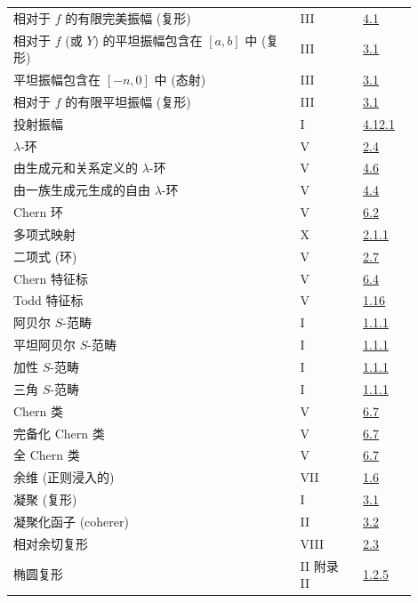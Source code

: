 \begin{longtable}{@{}>{\raggedright\arraybackslash}p{0.64\linewidth}>{\raggedright\arraybackslash}p{0.14\linewidth}>{\raggedright\arraybackslash}p{0.12\linewidth}@{}}
相对于 \(f\) 的有限完美振幅 (复形) & III & \hyperlink{sga6.e03.def.4-1}{4.1}\\
相对于 \(f\) (或 \(Y\)) 的平坦振幅包含在 \([a,b]\) 中 (复形) & III & \hyperlink{sga6.e03.def.3-1}{3.1}\\
平坦振幅包含在 \([-n,0]\) 中 (态射) & III & \hyperlink{sga6.e03.def.3-1}{3.1}\\
相对于 \(f\) 的有限平坦振幅 (复形) & III & \hyperlink{sga6.e03.def.3-1}{3.1}\\
投射振幅 & I & \hyperlink{sga6.e01.rem.4-12-1}{4.12.1}\\
\(\lambda\)-环 & V & \hyperlink{sga6.e05.def.2-4}{2.4}\\
由生成元和关系定义的 \(\lambda\)-环 & V & \hyperlink{sga6.e05.def.4-6}{4.6}\\
由一族生成元生成的自由 \(\lambda\)-环 & V & \hyperlink{sga6.e05.def.4-4}{4.4}\\
Chern 环 & V & \hyperlink{sga6.e05.def.6-2}{6.2}\\
多项式映射 & X & \hyperlink{sga6.e10.def.2-1-1}{2.1.1}\\
二项式 (环) & V & \hyperlink{sga6.e05.def.2-7}{2.7}\\
Chern 特征标 & V & \hyperlink{sga6.e05.def.6-4}{6.4}\\
Todd 特征标 & V & \hyperlink{sga6.e05.para.1-16}{1.16}\\
阿贝尔 \(S\)-范畴 & I & \hyperlink{sga6.e01.para.1-1-1}{1.1.1}\\
平坦阿贝尔 \(S\)-范畴 & I & \hyperlink{sga6.e01.para.1-1-1}{1.1.1}\\
加性 \(S\)-范畴 & I & \hyperlink{sga6.e01.para.1-1-1}{1.1.1}\\
三角 \(S\)-范畴 & I & \hyperlink{sga6.e01.para.1-1-1}{1.1.1}\\
Chern 类 & V & \hyperlink{sga6.e05.para.6-7}{6.7}\\
完备化 Chern 类 & V & \hyperlink{sga6.e05.para.6-7}{6.7}\\
全 Chern 类 & V & \hyperlink{sga6.e05.para.6-7}{6.7}\\
余维 (正则浸入的) & VII & \hyperlink{sga6.e07.def.1-6}{1.6}\\
凝聚 (复形) & I & \hyperlink{sga6.e01.def.3-1}{3.1}\\
凝聚化函子 (coherer) & II & \hyperlink{sga6.e02.sec.3.2}{3.2}\\
相对余切复形 & VIII & \hyperlink{sga6.e08.def.2-3}{2.3}\\
椭圆复形 & II 附录 II & \hyperlink{sga6.e02.para.1-2-5}{1.2.5}\\

\end{longtable}

